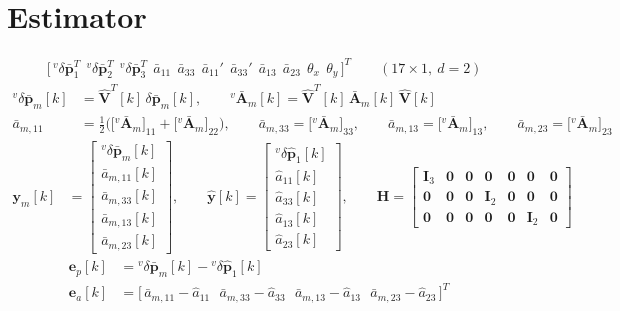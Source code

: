 \documentclass[11pt,a4paper]{ctexart}
\newcommand{\dl}{\delta}
\newcommand{\Am}{\bar{\mathbf A}_m}
\newcommand{\dpb}{\dl\bar{\mathbf p}}
\newcommand{\I}{\mathbf I}
\newcommand{\Vh}{\hat{\mathbf V}}
\newcommand{\apar}{\bar a_{11}}
\newcommand{\aper}{\bar a_{33}}
\newcommand{\T}{T}
\newcommand{\vAm}{{}^{v}\bar{\mathbf A}_m}
\newcommand{\vdp}{{}^{v}\dl\bar{\mathbf p}}
\newcommand{\vdph}{{}^{v}\dl\hat{\mathbf p}}
\begin{document}
\section{Estimator}
\vspace{1.2em}
\begin{align*}
&\big[\,\vdp_1^{\T}\ \ \vdp_2^{\T}\ \ \vdp_3^{\T}\ \ \apar\ \ \aper\ \ \apar'\ \ \aper'\ \ \bar a_{13}\ \ \bar a_{23}\ \ \theta_x\ \ \theta_y\,\big]^{\T} \qquad (17 \times 1,\ d = 2)
\end{align*}
\vspace{1.2em}
\begin{align*}
{}^{v}\dpb_m[k] &= \Vh^{\T}[k]\,\dpb_m[k], \qquad \vAm[k] = \Vh^{\T}[k]\,\Am[k]\,\Vh[k] \\
\bar a_{m,11} &= \tfrac{1}{2}\Big(\big[\vAm\big]_{11} + \big[\vAm\big]_{22}\Big), \qquad \bar a_{m,33} = \big[\vAm\big]_{33}, \qquad
\bar a_{m,13} = \big[\vAm\big]_{13}, \qquad \bar a_{m,23} = \big[\vAm\big]_{23}
\end{align*}
\vspace{1.2em}
\begin{align*}
\mathbf y_m[k] &= \begin{bmatrix} {}^{v}\dpb_m[k] \\ \bar a_{m,11}[k] \\ \bar a_{m,33}[k] \\ \bar a_{m,13}[k] \\ \bar a_{m,23}[k] \end{bmatrix}, \qquad
\hat{\mathbf y}[k] = \begin{bmatrix} \vdph_1[k] \\ \hat a_{11}[k] \\ \hat a_{33}[k] \\ \hat a_{13}[k] \\ \hat a_{23}[k] \end{bmatrix}, \qquad
\mathbf H = \begin{bmatrix} \I_3 & \mathbf 0 & \mathbf 0 & \mathbf 0 & \mathbf 0 & \mathbf 0 & \mathbf 0 \\ \mathbf 0 & \mathbf 0 & \mathbf 0 & \I_2 & \mathbf 0 & \mathbf 0 & \mathbf 0 \\ \mathbf 0 & \mathbf 0 & \mathbf 0 & \mathbf 0 & \mathbf 0 & \I_2 & \mathbf 0 \end{bmatrix}
\end{align*}
\vspace{1.2em}
\begin{align*}
\mathbf e_p[k] &= {}^{v}\dpb_m[k] - \vdph_1[k] \\
\mathbf e_a[k] &= \big[\,\bar a_{m,11} - \hat a_{11}\ \ \ \bar a_{m,33} - \hat a_{33}\ \ \ \bar a_{m,13} - \hat a_{13}\ \ \ \bar a_{m,23} - \hat a_{23}\,\big]^{\T}
\end{align*}
\end{document}
